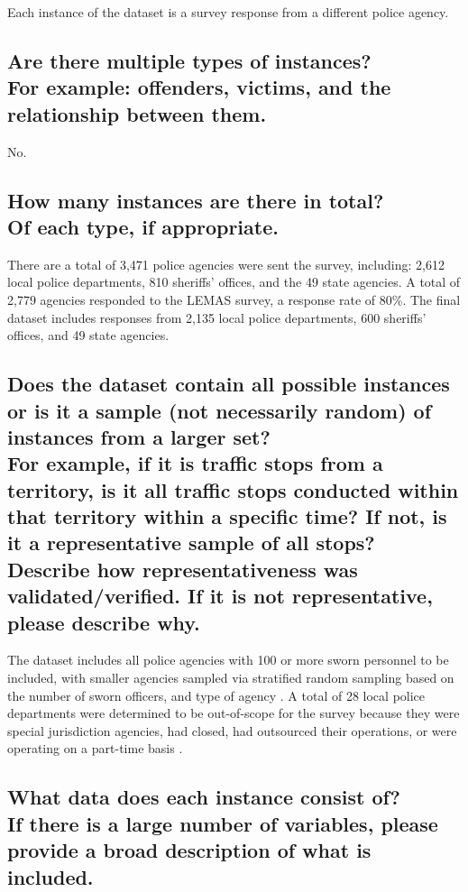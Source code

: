 \documentclass[letterpaper, 10 pt, conference]{ieeeconf}  %
\newcommand{\subtitle}[1]{{\\ \small \normalfont \color{purple} #1}}
\begin{document}
Each instance of the dataset is a survey response from a different  police agency.

\subsection{Are there multiple types of instances? \subtitle{For example: offenders, victims, and the relationship between them.}}

No.

\subsection{How many instances are there in total? \subtitle{Of each type, if appropriate.}}

There are a total of 3,471 police agencies were sent the survey, including: 2,612 local police departments, 810 sheriffs' offices, and the 49 state agencies.
A total of 2,779 agencies responded to the LEMAS survey, a response rate of 80\%. The final dataset includes responses from 2,135 local police departments, 600 sheriffs' offices, and 49 state agencies.

\subsection{Does the dataset contain all possible instances or is it a sample (not necessarily random) of instances from a larger set? \subtitle{For example, if it is traffic stops from a territory, is it all traffic stops conducted within that territory within a specific time? If not, is it a representative sample of all stops? Describe how representativeness was validated/verified. If it is not representative, please describe why.}}

The dataset includes all police agencies with 100 or more sworn personnel to be included, with smaller agencies sampled via stratified random sampling based on the number of sworn officers, and type of agency \cite{davis_2016}. A total of 28 local police departments were determined to be out-of-scope for the survey because they were special jurisdiction agencies, had closed, had outsourced their operations, or were operating on a part-time basis \cite{davis_2016}.

\subsection{What data does each instance consist of? \subtitle{If there is a large number of variables, please provide a broad description of what is included.}}
\end{document}
